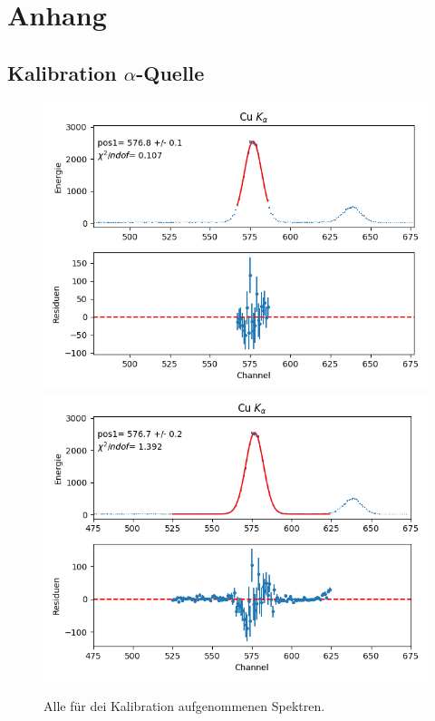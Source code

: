 \documentclass[12pt,a4paper]{article}
\begin{document}
\section{Anhang}
\subsection{Kalibration $\alpha$-Quelle}
\begin{figure}[H]
\centering
\includegraphics[scale=0.8]{Bilder/alpha/cu_alpha_1.png}
\includegraphics[scale=0.8]{Bilder/alpha/cu_alpha_2.png}
\caption{Alle für dei Kalibration aufgenommenen Spektren.}
\label{fig:kal_alles}
\end{figure}
\end{document}
